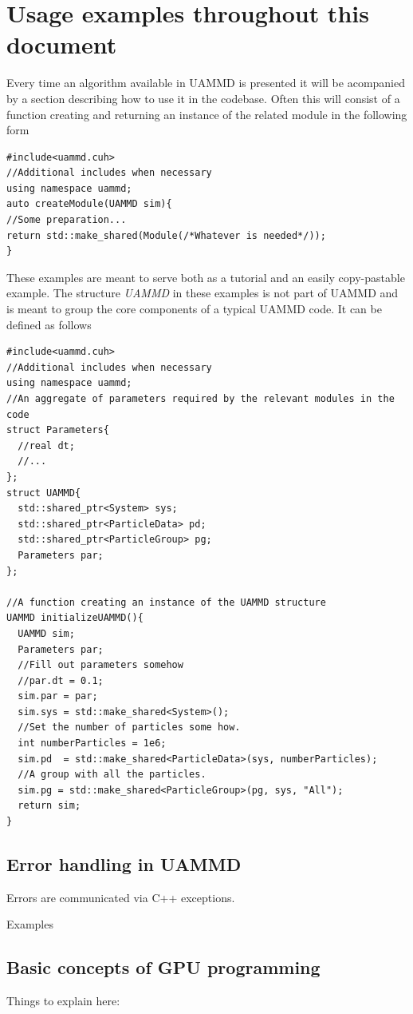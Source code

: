 \documentclass[ twoside,openright,titlepage,numbers=noenddot,%
headinclude,footinclude,cleardoublepage=empty,abstract=on,
BCOR=5mm,paper=a4,fontsize=11pt, dvipsnames
]{scrreprt}
\newcommand{\uammd}{\gls{UAMMD}\xspace}
\begin{document}
\chapter{Usage examples throughout this document}\label{sec:uammd_struct}
Every time an algorithm available in \uammd is presented it will be acompanied by a section describing how to use it in the codebase.
Often this will consist of a function creating and returning an instance of the related module in the following form


\begin{verbatim}
#include<uammd.cuh>
//Additional includes when necessary
using namespace uammd;
auto createModule(UAMMD sim){
//Some preparation...
return std::make_shared(Module(/*Whatever is needed*/));
}
\end{verbatim}

These examples are meant to serve both as a tutorial and an easily copy-pastable example.
The structure \emph{UAMMD} in these examples is not part of \uammd and is meant to group the core components of a typical \uammd code. It can be defined as follows


\begin{verbatim}
#include<uammd.cuh>
//Additional includes when necessary
using namespace uammd;
//An aggregate of parameters required by the relevant modules in the code
struct Parameters{
  //real dt;
  //...
};
struct UAMMD{
  std::shared_ptr<System> sys;
  std::shared_ptr<ParticleData> pd;
  std::shared_ptr<ParticleGroup> pg;
  Parameters par;
};

//A function creating an instance of the UAMMD structure
UAMMD initializeUAMMD(){
  UAMMD sim;
  Parameters par;
  //Fill out parameters somehow
  //par.dt = 0.1;
  sim.par = par;
  sim.sys = std::make_shared<System>();
  //Set the number of particles some how.
  int numberParticles = 1e6;
  sim.pd  = std::make_shared<ParticleData>(sys, numberParticles);
  //A group with all the particles.
  sim.pg = std::make_shared<ParticleGroup>(pg, sys, "All");
  return sim;
}
\end{verbatim}

\section{Error handling in UAMMD}\label{sec:uammd_errors}
Errors are communicated via C++ exceptions.

Examples


\section{Basic concepts of GPU programming}
Things to explain here:
\end{document}
